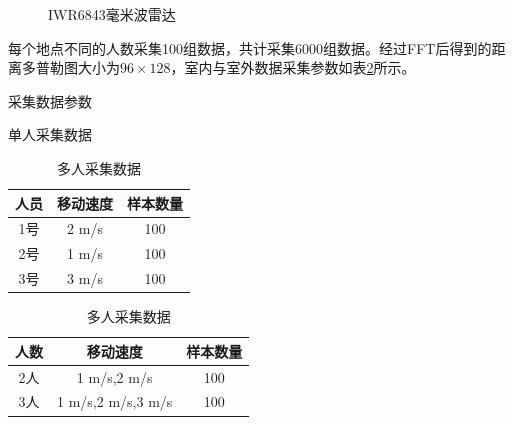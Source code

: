 \begin{figure}[htbp]
	\centering
	\caption{IWR6843毫米波雷达}
	\label{fig:实验设备}
\end{figure}


每个地点不同的人数采集100组数据，共计采集6000组数据。经过FFT后得到的距离多普勒图大小为$96 \times 128$，室内与室外数据采集参数如表\ref{采集数据参数}所示。
\begin{table}[htbp]
	\caption{采集数据参数}
	\begin{subtable}{.4\linewidth}
		\centering
		\caption{单人采集数据}
		\begin{tabular}{ccc}
			\toprule
		    人员 & 移动速度 & 样本数量  \\
			\midrule
			1号 &2 m/s & 100 \\
			2号 &1 m/s & 100 \\
			3号 &3 m/s & 100  \\
			\bottomrule
		\end{tabular}
	\end{subtable}
	\begin{subtable}{.4\linewidth}
		\centering
		\caption{多人采集数据}
		\begin{tabular}{ccc}
			\toprule
			人数 & 移动速度 & 样本数量  \\
			\midrule
			2人 & 1 m/s,2 m/s& 100 \\
			3人 & 1 m/s,2 m/s,3 m/s & 100  \\
			\bottomrule
		\end{tabular}
	\end{subtable}
	\label{采集数据参数}
\end{table}

